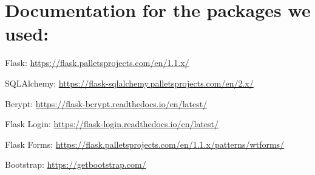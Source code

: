 \documentclass[]{book}
\begin{document}
\section{Documentation for the packages we
used:}\label{documentation-for-the-packages-we-used}

Flask: \url{https://flask.palletsprojects.com/en/1.1.x/}

SQLAlchemy: \url{https://flask-sqlalchemy.palletsprojects.com/en/2.x/}

Bcrypt: \url{https://flask-bcrypt.readthedocs.io/en/latest/}

Flask Login: \url{https://flask-login.readthedocs.io/en/latest/}

Flask Forms:
\url{https://flask.palletsprojects.com/en/1.1.x/patterns/wtforms/}

Bootstrap: \url{https://getbootstrap.com/}
\end{document}
